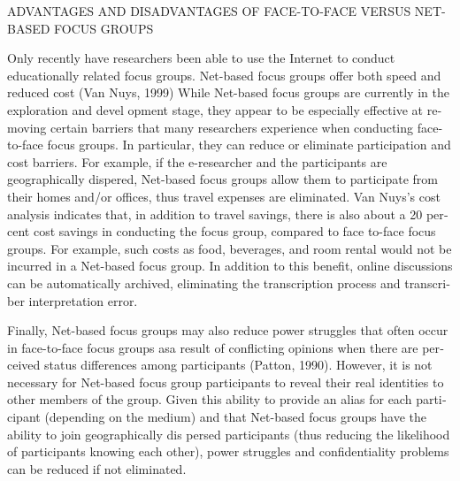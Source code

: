\documentclass[a4 paper,12pt]{article}\usepackage{xepersian}
\begin{document}
\begin{latin}
\noindent
  ADVANTAGES AND  DISADVANTAGES OF FACE-TO-FACE VERSUS  NET-BASED  FOCUS GROUPS\\
\vspace{0.1cm}

\noindent
Only recently have researchers been able to use the  Internet to conduct educationally related focus groups. Net-based focus groups offer both  speed and reduced cost  (Van Nuys,  1999) While Net-based focus groups are currently in the  exploration and  devel­ opment  stage, they appear to be especially effective at removing certain barriers that many  researchers experience when conducting face-to-face focus groups. In particular, they can  reduce or eliminate  participation and  cost  barriers. For example, if the  e­-researcher and the  participants are  geographically dispered,  Net-based  focus groups allow  them   to participate from their homes and/or offices, thus  travel   expenses are eliminated. Van Nuys's cost analysis indicates that, in addition to travel savings, there
is also  about a 20 percent cost savings in conducting the  focus group, compared to face­ to-face  focus groups. For example, such costs  as  food,  beverages, and room   rental would  not be incurred in a Net-based focus group. In addition to this  benefit, online discussions can  be automatically archived, eliminating the  transcription process and
transcriber interpretation error.
\vspace{0.1cm}


Finally, Net-based focus groups may also  reduce  power struggles that often occur in face-to-face focus groups asa result of conflicting opinions when there are perceived status differences among participants (Patton, 1990).  However, it  is not  necessary  for Net-based focus group participants to reveal  their real  identities to other members of the group. Given this ability  to provide an alias for each participant (depending on  the medium) and that Net-based focus groups have  the  ability  to join  geographically dis­ persed participants (thus reducing the  likelihood of participants knowing each  other), power struggles and confidentiality problems can  be reduced if not  eliminated.
\vspace{0.1cm}


\end{latin}
\end{document}
